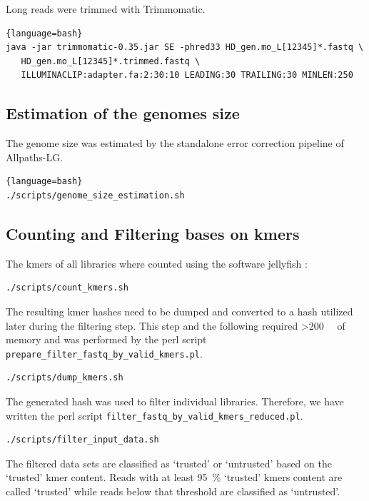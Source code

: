 \documentclass[12pt,a4paper]{scrartcl}
\begin{document}
Long reads were trimmed with Trimmomatic.

\begin{lstlisting}{language=bash}
java -jar trimmomatic-0.35.jar SE -phred33 HD_gen.mo_L[12345]*.fastq \
   HD_gen.mo_L[12345]*.trimmed.fastq \
   ILLUMINACLIP:adapter.fa:2:30:10 LEADING:30 TRAILING:30 MINLEN:250
\end{lstlisting}

\subsection*{Estimation of the genomes size}

The genome size was estimated by the standalone error
correction pipeline of Allpaths-LG.

\begin{lstlisting}{language=bash}
./scripts/genome_size_estimation.sh
\end{lstlisting}

\subsection*{Counting and Filtering bases on kmers}

The kmers of all libraries where counted using the software jellyfish
\parencite{Marcais2011}:

\begin{lstlisting}[language=bash]
./scripts/count_kmers.sh
\end{lstlisting}

The resulting kmer hashes need to be dumped and converted to a hash
utilized later during the filtering step. This step and the following
required \SI{>200}{\giga\byte} of memory and was performed by the perl
script \texttt{prepare\_filter\_fastq\_by\_valid\_kmers.pl}.

\begin{lstlisting}[language=bash]
./scripts/dump_kmers.sh
\end{lstlisting}

The generated hash was used to filter individual libraries. Therefore,
we have written the perl script
\texttt{filter\_fastq\_by\_valid\_kmers\_reduced.pl}.

\begin{lstlisting}[language=bash]
./scripts/filter_input_data.sh
\end{lstlisting}

The filtered data sets are classified as `trusted' or `untrusted'
based on the `trusted' kmer content. Reads with at least
\SI{95}{\percent} `trusted' kmers content are called `trusted'
while reads below that threshold are classified as `untrusted'.
\end{document}
